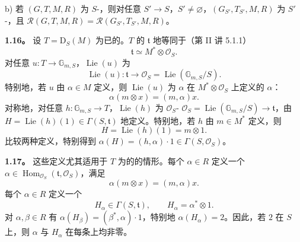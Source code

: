 b) 若 $(G,T,M,R)$ 为 $S$-，则对任意 $S'\to S$，$S'\ne\varnothing$，$(G_{S'},T_{S'},M,R)$ 为 $S'$-，且 $\mathcal R(G,T,M,R)=\mathcal R(G_{S'},T_{S'},M,R)$。

\textbf{1.16。} 设 $T=\mathrm D_S(M)$ 为已的。$T$ 的 $\mathfrak t$ 地等同于（第 II 讲 5.1.1）
\[\mathfrak t\simeq M^*\otimes\mathcal O_S.\]
对任意 $u:T\to\mathbb G_{m,S}$，$\operatorname{Lie}(u)$ 为
\[\operatorname{Lie}(u):\mathfrak t\longrightarrow\mathcal O_S=\operatorname{Lie}(\mathbb G_{m,S}/S).\]
特别地，若 $u$ 由 $\alpha\in M$ 定义，则 $\operatorname{Lie}(u)$ 为 $\alpha$ 在 $M^*\otimes\mathcal O_S$ 上定义的 $\alpha$：
\[\alpha(m\otimes x)=(m,\alpha)x.\]
对称地，对任意 $h:\mathbb G_{m,S}\to T$，$\operatorname{Lie}(h)$ 为 $\mathcal O_S$- $\mathcal O_S=\operatorname{Lie}(\mathbb G_{m,S}/S)\to\mathfrak t$，由 $H=\operatorname{Lie}(h)(1)\in\Gamma(S,\mathfrak t)$ 地定义。特别地，若 $h$ 由 $m\in M^*$ 定义，则
\[H=\operatorname{Lie}(h)(1)=m\otimes1.\]
比较两种定义，特别得到 $\alpha(H)=(h,\alpha)\cdot1\in\Gamma(S,\mathcal O_S)$。

\textbf{1.17。} 这些定义尤其适用于 $T$ 为的的情形。每个 $\alpha\in R$ 定义一个 $\alpha\in\operatorname{Hom}_{\mathcal O_S}(\mathfrak t,\mathcal O_S)$，满足
\[\alpha(m\otimes x)=(m,\alpha)x.\]
每个 $\alpha\in R$ 定义一个
\[H_\alpha\in\Gamma(S,\mathfrak t),\qquad H_\alpha=\alpha^*\otimes1.\]
对 $\alpha,\beta\in R$ 有 $\alpha(H_\beta)=(\beta^*,\alpha)\cdot1$，特别地 $\alpha(H_\alpha)=2$。因此，若 $2$ 在 $S$ 上，则 $\alpha$ 与 $H_\alpha$ 在每条上均非零。

